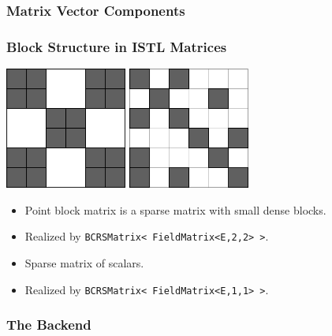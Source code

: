 \subsubsection{Matrix Vector Components}
\label{sec:matr-vect-comp}

\begin{frame}[fragile]
\frametitle{Block Structure in ISTL Matrices}
\begin{block}{}
\includegraphics[width=0.3\textwidth]{./EPS/pointblockmatrix}\hfill
\includegraphics[width=0.3\textwidth]{./EPS/scalarmatrix}

\begin{minipage}{0.48\textwidth}
  \begin{itemize}
  \item  Point block matrix is a sparse matrix with small dense
blocks.
\item Realized by \lstinline!BCRSMatrix< FieldMatrix<E,2,2> >!. 
  \end{itemize}
\end{minipage}
\begin{minipage}{0.48\textwidth}
  \begin{itemize}
  \item Sparse matrix of scalars.
  \item Realized by \lstinline!BCRSMatrix< FieldMatrix<E,1,1> >!.
  \end{itemize}
\end{minipage}
\end{block}
\end{frame}


\subsubsection{The Backend}
\label{sec:backend}

